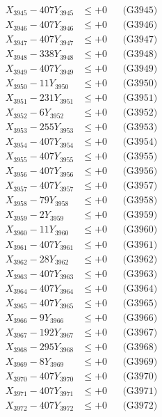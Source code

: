 \documentclass[a4paper,10pt]{article}
\begin{document}
{\begin{align}
X_{3945} - 407Y_{3945} &\leq +0 && \text{(G3945)} \\
X_{3946} - 407Y_{3946} &\leq +0 && \text{(G3946)} \\
X_{3947} - 407Y_{3947} &\leq +0 && \text{(G3947)} \\
X_{3948} - 338Y_{3948} &\leq +0 && \text{(G3948)} \\
X_{3949} - 407Y_{3949} &\leq +0 && \text{(G3949)} \\
X_{3950} - 11Y_{3950} &\leq +0 && \text{(G3950)} \\
\allowbreak
X_{3951} - 231Y_{3951} &\leq +0 && \text{(G3951)} \\
X_{3952} - 6Y_{3952} &\leq +0 && \text{(G3952)} \\
X_{3953} - 255Y_{3953} &\leq +0 && \text{(G3953)} \\
X_{3954} - 407Y_{3954} &\leq +0 && \text{(G3954)} \\
X_{3955} - 407Y_{3955} &\leq +0 && \text{(G3955)} \\
X_{3956} - 407Y_{3956} &\leq +0 && \text{(G3956)} \\
X_{3957} - 407Y_{3957} &\leq +0 && \text{(G3957)} \\
X_{3958} - 79Y_{3958} &\leq +0 && \text{(G3958)} \\
X_{3959} - 2Y_{3959} &\leq +0 && \text{(G3959)} \\
X_{3960} - 11Y_{3960} &\leq +0 && \text{(G3960)} \\
\allowbreak
X_{3961} - 407Y_{3961} &\leq +0 && \text{(G3961)} \\
X_{3962} - 28Y_{3962} &\leq +0 && \text{(G3962)} \\
X_{3963} - 407Y_{3963} &\leq +0 && \text{(G3963)} \\
X_{3964} - 407Y_{3964} &\leq +0 && \text{(G3964)} \\
X_{3965} - 407Y_{3965} &\leq +0 && \text{(G3965)} \\
X_{3966} - 9Y_{3966} &\leq +0 && \text{(G3966)} \\
X_{3967} - 192Y_{3967} &\leq +0 && \text{(G3967)} \\
X_{3968} - 295Y_{3968} &\leq +0 && \text{(G3968)} \\
X_{3969} - 8Y_{3969} &\leq +0 && \text{(G3969)} \\
X_{3970} - 407Y_{3970} &\leq +0 && \text{(G3970)} \\
\allowbreak
X_{3971} - 407Y_{3971} &\leq +0 && \text{(G3971)} \\
X_{3972} - 407Y_{3972} &\leq +0 && \text{(G3972)} \\

\end{align}}
\end{document}
